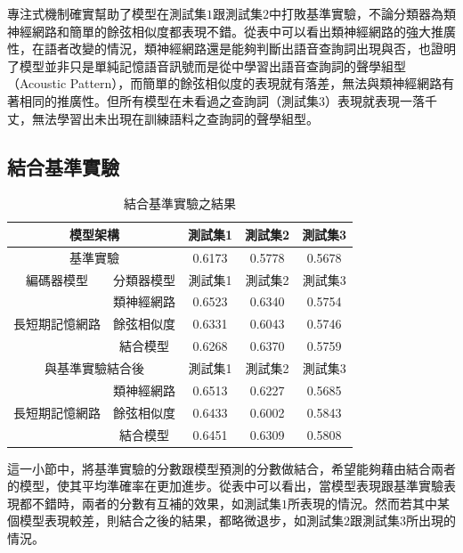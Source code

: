專注式機制確實幫助了模型在測試集$1$跟測試集$2$中打敗基準實驗，不論分類器為類神經網路和簡單的餘弦相似度都表現不錯。從表中可以看出類神經網路的強大推廣性，在語者改變的情況，類神經網路還是能夠判斷出語音查詢詞出現與否，也證明了模型並非只是單純記憶語音訊號而是從中學習出語音查詢詞的聲學組型（Acoustic
Pattern），而簡單的餘弦相似度的表現就有落差，無法與類神經網路有著相同的推廣性。但所有模型在未看過之查詢詞（測試集$3$）表現就表現一落千丈，無法學習出未出現在訓練語料之查詢詞的聲學組型。

\subsection{結合基準實驗}
\begin{table}[ht]
	 \centering
	 \caption{結合基準實驗之結果}
	 \label{table:ch3_late_fusion}
	 \begin{tabular}{|c|c|c|c|c|}
		 \hline
		 \multicolumn{2}{|c|}{模型架構} & 測試集1 & 測試集2 & 測試集3 \\
		 \hline
		 \multicolumn{2}{|c|}{基準實驗} & 0.6173 & 0.5778 & 0.5678\\
		 \hline
		 \hline 
		 編碼器模型 & 分類器模型 & 測試集1 &測試集2 & 測試集3 \\
		 \hline
		 \multirow{3}{*}{長短期記憶網路} & 類神經網路 &
		 0.6523 &0.6340 & 0.5754 \\
		 \cline{2-5}
		 & 餘弦相似度& 0.6331 & 0.6043 & 0.5746 \\
		 \cline{2-5}
		 & 結合模型 & 0.6268 & 0.6370 & 0.5759 \\ 
		 \hline
		 \hline
		 \multicolumn{2}{|c|}{與基準實驗結合後} & 測試集1 &測試集2
		 &測試集3 \\
		 \hline
		 \multirow{3}{*}{長短期記憶網路} & 類神經網路 &
		 {\color{red}0.6513} & 0.6227 & 0.5685\\
		 \cline{2-5}
		 & 餘弦相似度& 0.6433&0.6002&0.5843 \\
		 \cline{2-5}
		 & 結合模型 &0.6451&0.6309	&0.5808 \\
		 \hline
	   \end{tabular}
\end{table}

這一小節中，將基準實驗的分數跟模型預測的分數做結合，希望能夠藉由結合兩者的模型，使其平均準確率在更加進步。從表中可以看出，當模型表現跟基準實驗表現都不錯時，兩者的分數有互補的效果，如測試集$1$所表現的情況。然而若其中某個模型表現較差，則結合之後的結果，都略微退步，如測試集$2$跟測試集$3$所出現的情況。
